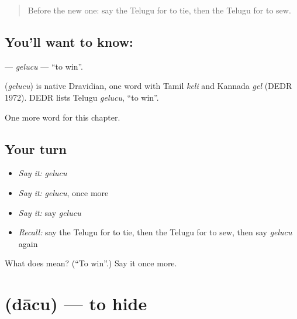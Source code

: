\label{lesson:TE-C147-gelucu}



\begin{quote}
Before the new one: say the Telugu for to tie, then the Telugu for to sew.
\end{quote}

\subsection*{You'll want to know: }
\textbf{} — \emph{gelucu} — \textquotedblleft{}to win\textquotedblright{}.

\begin{cousinweb}
\textbf{} (\emph{gelucu}) is native Dravidian, one word with Tamil \emph{keli} and Kannada \emph{gel} (DEDR 1972). DEDR lists Telugu \emph{gelucu}, \textquotedblleft{}to win\textquotedblright{}.
\end{cousinweb}

\begin{grammarlens}[title={What you've built}]
One more word for this chapter.
\end{grammarlens}

\subsection*{Your turn}
\begin{itemize}
\raggedright
  \item \emph{Say it:} \emph{gelucu}
  \item \emph{Say it:} \emph{gelucu}, once more
  \item \emph{Say it:} say \emph{gelucu}
  \item \emph{Recall:} say the Telugu for to tie, then the Telugu for to sew, then say \emph{gelucu} again
\end{itemize}

\begin{tcolorbox}[breakable,colback=teal!4,colframe=teal!35!black,title={Before you move on}]
What does  mean? (\textquotedblleft{}To win\textquotedblright{}.) Say it once more.
\end{tcolorbox}
\section[\texorpdfstring{\te{దాచు} (dācu)}{దాచు (dācu)}]{ (dācu) — to hide}

\label{lesson:TE-C147-dacu}



